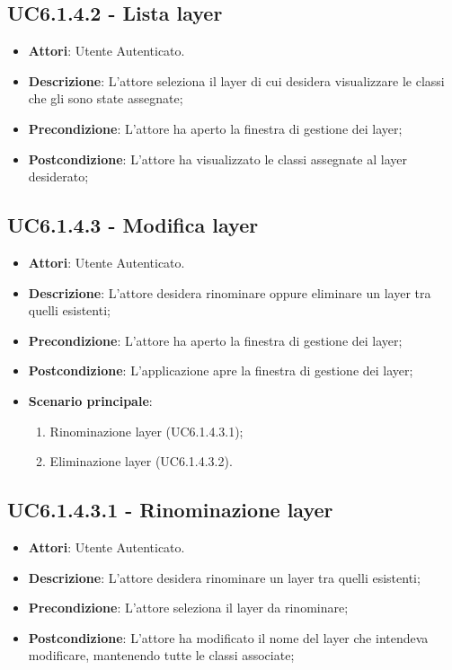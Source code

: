 \subsection{UC6.1.4.2 - Lista layer} 
\label{ssec:UC6.1.4.2} 
\begin{itemize} 
\item \textbf{Attori}: Utente Autenticato.
\item \textbf{Descrizione}: L'attore seleziona il layer di cui desidera visualizzare le classi che gli sono state assegnate;
\item \textbf{Precondizione}: L'attore ha aperto la finestra di gestione dei layer;
\item \textbf{Postcondizione}: L'attore ha visualizzato le classi assegnate al layer desiderato;
\end{itemize} 
\subsection{UC6.1.4.3 - Modifica layer} 
\label{ssec:UC6.1.4.3} 
\begin{itemize} 
\item \textbf{Attori}: Utente Autenticato.
\item \textbf{Descrizione}: L'attore desidera rinominare oppure eliminare un layer tra quelli esistenti;
\item \textbf{Precondizione}: L'attore ha aperto la finestra di gestione dei layer;
\item \textbf{Postcondizione}: L'applicazione apre la finestra di gestione dei layer;
\item \textbf{Scenario principale}: \begin{enumerate}\item Rinominazione layer (UC6.1.4.3.1);\item Eliminazione layer (UC6.1.4.3.2). 
 \end{enumerate}
\end{itemize} 
\subsection{UC6.1.4.3.1 - Rinominazione layer} 
\label{ssec:UC6.1.4.3.1} 
\begin{itemize} 
\item \textbf{Attori}: Utente Autenticato.
\item \textbf{Descrizione}: L'attore desidera rinominare un layer tra quelli esistenti;
\item \textbf{Precondizione}: L'attore seleziona il layer da rinominare;
\item \textbf{Postcondizione}: L'attore ha modificato il nome del layer che intendeva modificare, mantenendo tutte le classi associate;
\end{itemize} 
